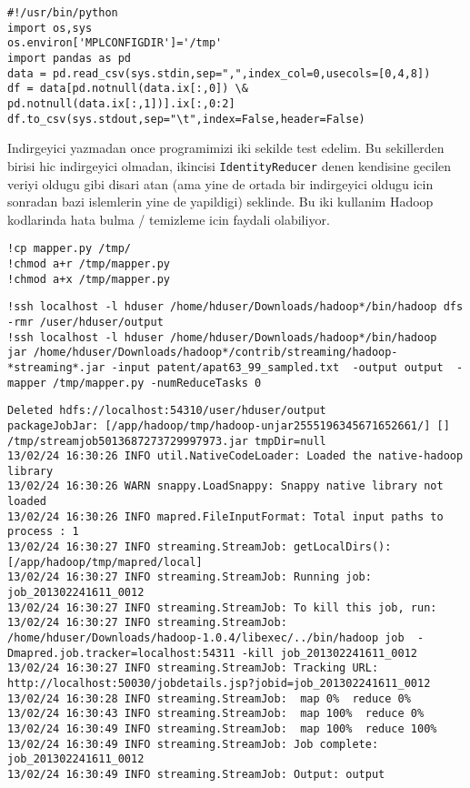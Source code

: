\documentclass[12pt,fleqn]{article}\usepackage{../common}
\begin{document}
\begin{verbatim}
#!/usr/bin/python
import os,sys
os.environ['MPLCONFIGDIR']='/tmp' 
import pandas as pd
data = pd.read_csv(sys.stdin,sep=",",index_col=0,usecols=[0,4,8])
df = data[pd.notnull(data.ix[:,0]) \& pd.notnull(data.ix[:,1])].ix[:,0:2]
df.to_csv(sys.stdout,sep="\t",index=False,header=False)
\end{verbatim}

Indirgeyici yazmadan once programimizi iki sekilde test edelim. Bu
sekillerden birisi hic indirgeyici olmadan, ikincisi
\verb!IdentityReducer! denen kendisine gecilen veriyi oldugu
gibi disari atan (ama yine de ortada bir indirgeyici oldugu icin
sonradan bazi islemlerin yine de yapildigi) seklinde. Bu iki kullanim
Hadoop kodlarinda hata bulma / temizleme icin faydali olabiliyor.

\begin{verbatim}
!cp mapper.py /tmp/
!chmod a+r /tmp/mapper.py
!chmod a+x /tmp/mapper.py
\end{verbatim}

\begin{verbatim}
!ssh localhost -l hduser /home/hduser/Downloads/hadoop*/bin/hadoop dfs -rmr /user/hduser/output
!ssh localhost -l hduser /home/hduser/Downloads/hadoop*/bin/hadoop  jar /home/hduser/Downloads/hadoop*/contrib/streaming/hadoop-*streaming*.jar -input patent/apat63_99_sampled.txt  -output output  -mapper /tmp/mapper.py -numReduceTasks 0 
\end{verbatim}

\begin{verbatim}
Deleted hdfs://localhost:54310/user/hduser/output
packageJobJar: [/app/hadoop/tmp/hadoop-unjar2555196345671652661/] [] /tmp/streamjob5013687273729997973.jar tmpDir=null
13/02/24 16:30:26 INFO util.NativeCodeLoader: Loaded the native-hadoop library
13/02/24 16:30:26 WARN snappy.LoadSnappy: Snappy native library not loaded
13/02/24 16:30:26 INFO mapred.FileInputFormat: Total input paths to process : 1
13/02/24 16:30:27 INFO streaming.StreamJob: getLocalDirs(): [/app/hadoop/tmp/mapred/local]
13/02/24 16:30:27 INFO streaming.StreamJob: Running job: job_201302241611_0012
13/02/24 16:30:27 INFO streaming.StreamJob: To kill this job, run:
13/02/24 16:30:27 INFO streaming.StreamJob: /home/hduser/Downloads/hadoop-1.0.4/libexec/../bin/hadoop job  -Dmapred.job.tracker=localhost:54311 -kill job_201302241611_0012
13/02/24 16:30:27 INFO streaming.StreamJob: Tracking URL: http://localhost:50030/jobdetails.jsp?jobid=job_201302241611_0012
13/02/24 16:30:28 INFO streaming.StreamJob:  map 0%  reduce 0%
13/02/24 16:30:43 INFO streaming.StreamJob:  map 100%  reduce 0%
13/02/24 16:30:49 INFO streaming.StreamJob:  map 100%  reduce 100%
13/02/24 16:30:49 INFO streaming.StreamJob: Job complete: job_201302241611_0012
13/02/24 16:30:49 INFO streaming.StreamJob: Output: output
\end{verbatim}
\end{document}
